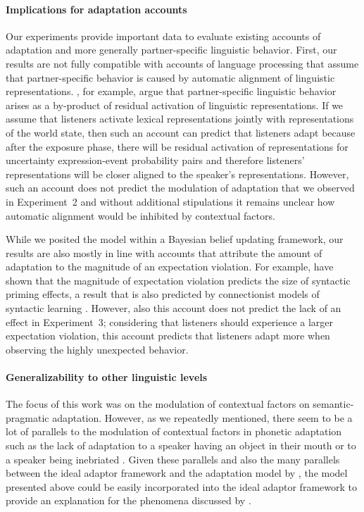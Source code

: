 \documentclass[man,floatsintext]{apa6}
\begin{document}
\paragraph{Implications for adaptation accounts} Our experiments provide important data to evaluate existing accounts of adaptation and more generally partner-specific linguistic behavior. First, our results are not fully compatible with accounts of language processing that assume that partner-specific behavior is caused by automatic alignment of linguistic representations. , for example, argue that partner-specific linguistic behavior arises as a by-product of residual activation of linguistic representations. If we assume 
that listeners activate lexical representations jointly with representations of the world state, then such an account can predict that listeners adapt because after the exposure phase, there will be residual activation of representations for uncertainty expression-event probability pairs and therefore listeners' representations will be closer aligned to the speaker's representations. However, such an account does not predict the modulation of adaptation that we observed in Experiment~2 and without additional stipulations it remains unclear how automatic alignment would be inhibited by contextual factors.

While we posited the model within a Bayesian belief updating framework, our results are also mostly in line with accounts that attribute the amount of adaptation to the magnitude of an expectation violation. For example,   have shown that the magnitude of expectation violation predicts the size of syntactic priming effects, a result that is also predicted by connectionist models of syntactic learning \cite{Chang2006}. However, also this account does not predict the lack of an effect in Experiment~3; considering that listeners should experience a larger expectation violation, this account predicts that listeners adapt more when observing the highly unexpected behavior.


\paragraph{Generalizability to other linguistic levels} The focus of this work was on the modulation of contextual factors on semantic-pragmatic adaptation. However, as we repeatedly mentioned, there seem to be a lot of parallels to the modulation of contextual factors in phonetic adaptation such as the lack of adaptation to a speaker having an object in their mouth or to a speaker being inebriated \cite{Kraljic2008}. Given these parallels and also the many parallels between the ideal adaptor framework \cite{Kleinschmidt2015} and the adaptation model by , the model presented above could be easily incorporated into the ideal adaptor framework to provide an explanation for the phenomena discussed by .
\end{document}

